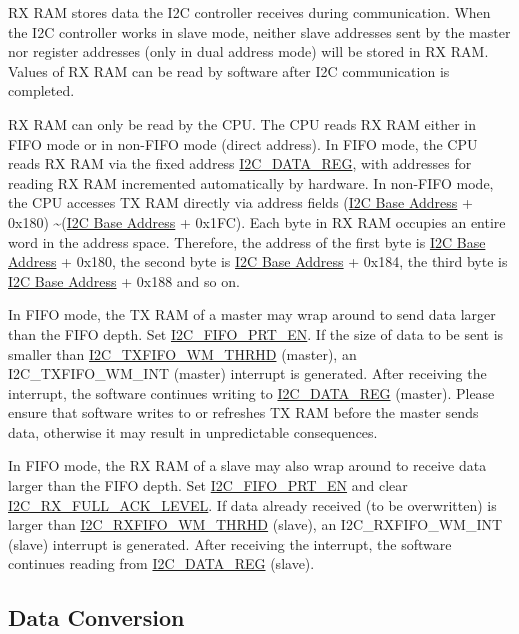 \documentclass[main\_\_EN.tex]{subfiles}
\begin{document}
RX RAM stores data the I2C controller receives during communication. When the I2C controller works in slave mode, neither slave addresses sent by the master nor register addresses (only in dual address mode) will be stored in RX RAM. Values of RX RAM can be read by software after I2C communication is completed.

RX RAM can only be read by the CPU. The CPU reads RX RAM either in FIFO mode or in non-FIFO mode (direct address). In FIFO mode, the CPU reads RX RAM via the fixed address \hyperref[regdesc:I2CDATAREG]{I2C\_DATA\_REG}, with addresses for reading RX RAM incremented automatically by hardware. In non-FIFO mode, the CPU accesses TX RAM directly via address fields (\hyperref[tab:sysmem-base-address]{I2C Base Address} + 0x180) \textasciitilde (\hyperref[tab:sysmem-base-address]{I2C Base Address} + 0x1FC). Each byte in RX RAM occupies an entire word in the address space. Therefore, the address of the first byte is \hyperref[tab:sysmem-base-address]{I2C Base Address} + 0x180, the second byte is \hyperref[tab:sysmem-base-address]{I2C Base Address} + 0x184, the third byte is \hyperref[tab:sysmem-base-address]{I2C Base Address} + 0x188 and so on.

In FIFO mode, the TX RAM of a master may wrap around to send data larger than the FIFO depth. Set \hyperref[fielddesc:I2CFIFOPRTEN]{I2C\_FIFO\_PRT\_EN}. If the size of data to be sent is smaller than \hyperref[fielddesc:I2CTXFIFOWMTHRHD]{I2C\_TXFIFO\_WM\_THRHD} (master), an I2C\_TXFIFO\_WM\_INT (master) interrupt is generated. After receiving the interrupt, the software continues writing to \hyperref[regdesc:I2CDATAREG]{I2C\_DATA\_REG} (master). Please ensure that software writes to or refreshes TX RAM before the master sends data, otherwise it may result in unpredictable consequences.

In FIFO mode, the RX RAM of a slave may also wrap around to receive data larger than the FIFO depth. Set \hyperref[fielddesc:I2CFIFOPRTEN]{I2C\_FIFO\_PRT\_EN} and clear \hyperref[fielddesc:I2CRXFULLACKLEVEL]{I2C\_RX\_FULL\_ACK\_LEVEL}. If data already received (to be overwritten) is larger than \hyperref[fielddesc:I2CRXFIFOWMTHRHD]{I2C\_RXFIFO\_WM\_THRHD} (slave), an I2C\_RXFIFO\_WM\_INT (slave) interrupt is generated. After receiving the interrupt, the software continues reading from \hyperref[regdesc:I2CDATAREG]{I2C\_DATA\_REG} (slave).

\subsection{Data Conversion}
\end{document}
